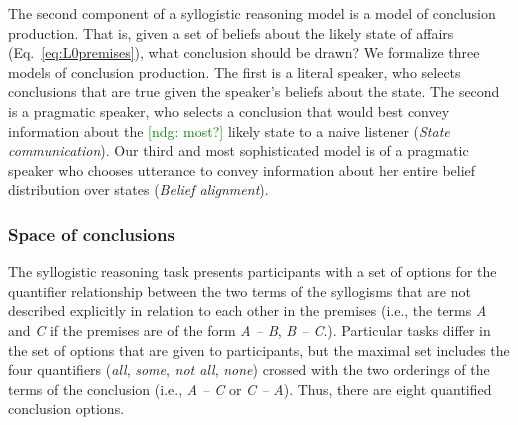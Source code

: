 \documentclass[floatsintext, doc]{apa6}
\newcommand{\mht}[1]{{\textcolor{Blue}{[mht: #1]}}}
\newcommand{\ndg}[1]{{\textcolor{Green}{[ndg: #1]}}}
\begin{document}
The second component of a syllogistic reasoning model is a model of conclusion production. 
That is, given a set of beliefs about the likely state of affairs (Eq.~\ref{eq:L0premises}), what conclusion should be drawn?
We formalize three models of conclusion production.
The first is a literal speaker, who selects conclusions that are true given the speaker's beliefs about the state. 
The second is a pragmatic speaker, who selects a conclusion that would best convey information about the \ndg{most?} likely state to a naive listener (\emph{State communication}). 
Our third and most sophisticated model is of a pragmatic speaker who chooses utterance to convey information about her entire belief distribution over states (\emph{Belief alignment}). 

\subsubsection{Space of conclusions}

The syllogistic reasoning task presents participants with a set of options for the quantifier relationship between the two terms of the syllogisms that are not described explicitly in relation to each other in the premises (i.e., the terms \emph{A} and \emph{C} if the premises are of the form \emph{A -- B}, \emph{B -- C}.). 
Particular tasks differ in the set of options that are given to participants, but the maximal set includes the four quantifiers  (\emph{all}, \emph{some}, \emph{not all}, \emph{none}) crossed with the two orderings of the terms of the conclusion (i.e., \emph{A -- C} or \emph{C -- A}).
Thus, there are eight quantified conclusion options. 
\end{document}
